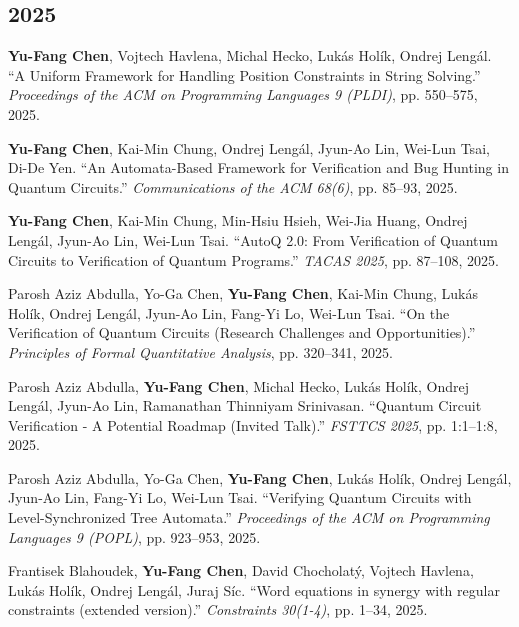\documentclass[10.5pt]{article}
\begin{document}
\subsection*{2025}
\begin{enumerate}[leftmargin=*,label={[\arabic*]},resume]
\item \textbf{Yu-Fang Chen}, Vojtech Havlena, Michal Hecko, Lukás Holík, Ondrej Lengál. ``A Uniform Framework for Handling Position Constraints in String Solving.'' \emph{Proceedings of the ACM on Programming Languages 9 (PLDI)}, pp. 550--575, 2025.
\item \textbf{Yu-Fang Chen}, Kai-Min Chung, Ondrej Lengál, Jyun-Ao Lin, Wei-Lun Tsai, Di-De Yen. ``An Automata-Based Framework for Verification and Bug Hunting in Quantum Circuits.'' \emph{Communications of the ACM 68(6)}, pp. 85--93, 2025.
\item \textbf{Yu-Fang Chen}, Kai-Min Chung, Min-Hsiu Hsieh, Wei-Jia Huang, Ondrej Lengál, Jyun-Ao Lin, Wei-Lun Tsai. ``AutoQ 2.0: From Verification of Quantum Circuits to Verification of Quantum Programs.'' \emph{TACAS 2025}, pp. 87--108, 2025.
\item Parosh Aziz Abdulla, Yo-Ga Chen, \textbf{Yu-Fang Chen}, Kai-Min Chung, Lukás Holík, Ondrej Lengál, Jyun-Ao Lin, Fang-Yi Lo, Wei-Lun Tsai. ``On the Verification of Quantum Circuits (Research Challenges and Opportunities).'' \emph{Principles of Formal Quantitative Analysis}, pp. 320--341, 2025.
\item Parosh Aziz Abdulla, \textbf{Yu-Fang Chen}, Michal Hecko, Lukás Holík, Ondrej Lengál, Jyun-Ao Lin, Ramanathan Thinniyam Srinivasan. ``Quantum Circuit Verification - A Potential Roadmap (Invited Talk).'' \emph{FSTTCS 2025}, pp. 1:1--1:8, 2025.
\item Parosh Aziz Abdulla, Yo-Ga Chen, \textbf{Yu-Fang Chen}, Lukás Holík, Ondrej Lengál, Jyun-Ao Lin, Fang-Yi Lo, Wei-Lun Tsai. ``Verifying Quantum Circuits with Level-Synchronized Tree Automata.'' \emph{Proceedings of the ACM on Programming Languages 9 (POPL)}, pp. 923--953, 2025.
\item Frantisek Blahoudek, \textbf{Yu-Fang Chen}, David Chocholatý, Vojtech Havlena, Lukás Holík, Ondrej Lengál, Juraj Síc. ``Word equations in synergy with regular constraints (extended version).'' \emph{Constraints 30(1-4)}, pp. 1--34, 2025.
\end{enumerate}
\end{document}
